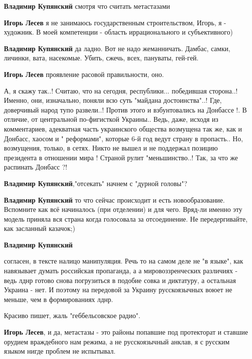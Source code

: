 \begin{itemize}
\begin{itemize}
\textbf{Владимир Купянский} смотря что считать метастазами

\textbf{Игорь Лесев} я не занимаюсь государственным строительством, Игорь, я - художник. В моей компетенции - область иррационального и субъективного)

\textbf{Владимир Купянский} да ладно. Вот не надо жеманничать. Дамбас, самки, личинки, вата, насекомые. Убить, сжечь, всех, пануваты, гей-гей.

\textbf{Игорь Лесев} проявление расовой правильности, оно.


А, я скажу так..! Считаю, что на сегодня, республики... победившая сторона..!
Именно, они, изначально, поняли всю суть "майдана достоинства"..! Где,
доверчивый народ тупо развели..! Против этого и взбунтовались на Донбассе !. В
отличие, от центральной по-фигисткой Украины.. Ведь, даже, исходя из
комментариев, адекватная часть украинского общества возмущена так же, как и
Донбасс, хаосом и " реформами", которые 6-й год ведут страну в пропасть.. Но,
возмущения, только, в сетях. Никто не вышел и не поддержал позицию президента в
отношении мира ! Страной рулит "меньшинство..! Так, за что же распинать Донбасс
?!

\textbf{Владимир Купянский},"отсекать" начнем с "дурной головы"?

\textbf{Владимир Купянский} то что сейчас происходит и есть новообразование. Вспомните как всё начиналось (при отделении) и для чего. Вряд-ли именно эту модель приняла вся страна когда голосовала за отсоединение. Не передергивайте, как засланный казачок;)

\textbf{Владимир Купянский} 

согласен, в тексте налицо манипуляция. Речь то на самом деле не "в языке", как
навязывает думать российская пропаганда, а а мировоззренческих различиях -
ведь лднр готово снова погрузиться в подобие совка и диктатуру, а остальная
Украина - нет. И поэтому на передовой за Украину русскоязычных воюет не меньше,
чем в формированиях лднр.

Красиво пишет, жаль "геббельсовское радио".

\textbf{Игорь Лесев}, и да, метастазы - это районы попавшие под протекторат и ставшие
орудием враждебного нам режима, а не русскоязычный анклав, я с русским языком
нигде проблем не испытывал.



\end{itemize}
\end{itemize}

